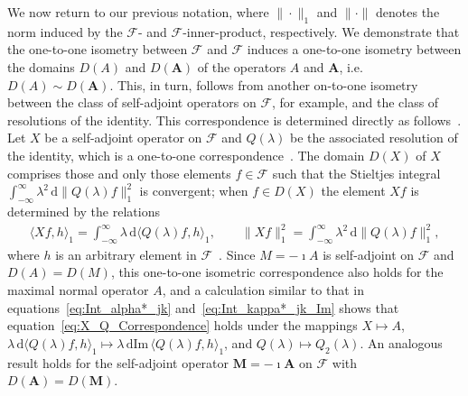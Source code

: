 \documentclass[leqno,onefignum,onetabnum]{siamltex1213}
\renewcommand{\d}{\mathrm{d}}
\newcommand{\Mb}{\mathbf{M}}
\newcommand{\Ab}{\mathbf{A}}
\newcommand{\Fc}{\mathcal{F}}
\newcommand{\Fs}{\mathscr{F}}
\begin{document}
We now return to our previous notation, where $\|\cdot\|_1$ and $\|\cdot\|$
denotes the norm induced by the $\Fs$- and $\Fc$-inner-product, 
respectively. We demonstrate that the one-to-one isometry between
$\Fs$ and $\Fc$ induces a one-to-one isometry between the domains
$D(A)$ and $D(\Ab)$ of the operators $A$ and $\Ab$,
i.e. $D(A)\sim D(\Ab)$. This, in turn, follows from another on-to-one
isometry between the class of self-adjoint operators on $\Fs$, for
example, and the class of resolutions of the identity. This 
correspondence is determined directly as follows~\cite{Stone:64}. Let
$X$ be a self-adjoint operator on $\Fs$ and $Q(\lambda)$ be the associated
resolution of the identity, which is a one-to-one
correspondence~\cite{Stone:64}. The domain $D(X)$ of $X$ comprises
those and only 
those elements $f\in\Fs$ such that the Stieltjes integral
$\int_{-\infty}^\infty\lambda^2\,\d\|Q(\lambda)f\|_1^2$ is convergent; when $f\in D(X)$ the element
$Xf$ is determined by the relations    
%
\begin{align}%
  \langle Xf,h\rangle_1=\int_{-\infty}^\infty\lambda\,\d\langle Q(\lambda)f,h\rangle_1, \qquad
  \|Xf\|_1^2=\int_{-\infty}^\infty\lambda^2\,\d\|Q(\lambda)f\|_1^2,
\end{align}
%
where $h$ is an arbitrary element in $\Fs$~\cite{Stone:64}. Since
$M=-\imath A$ is 
self-adjoint on $\Fs$ and $D(A)=D(M)$, this one-to-one isometric
correspondence also holds for the maximal normal operator $A$, and a
calculation similar to that in equations~\eqref{eq:Int_alpha*_jk}
and~\eqref{eq:Int_kappa*_jk_Im} shows that
equation~\eqref{eq:X_Q_Correspondence} holds under the mappings
$X\mapsto A$, 
$\lambda\,\d\langle Q(\lambda)f,h\rangle_1\mapsto\lambda\,\d\text{Im}\,\langle Q(\lambda)f,h\rangle_1$, and $Q(\lambda)\mapsto Q_2(\lambda)$. An 
analogous result holds 
for the self-adjoint operator $\Mb=-\imath\Ab$ on $\Fc$ with
$D(\Ab)=D(\Mb)$.
\end{document}
